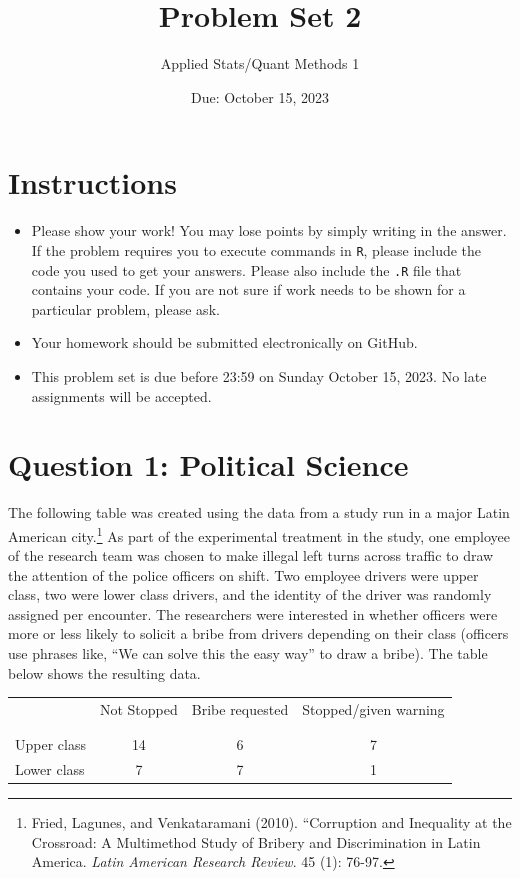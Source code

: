 \documentclass[12pt,letterpaper]{article}
\title{Problem Set 2}
\date{Due: October 15, 2023}
\author{Applied Stats/Quant Methods 1}
\begin{document}
	\maketitle
	\section*{Instructions}
	\begin{itemize}
		\item Please show your work! You may lose points by simply writing in the answer. If the problem requires you to execute commands in \texttt{R}, please include the code you used to get your answers. Please also include the \texttt{.R} file that contains your code. If you are not sure if work needs to be shown for a particular problem, please ask.
		\item Your homework should be submitted electronically on GitHub.
		\item This problem set is due before 23:59 on Sunday October 15, 2023. No late assignments will be accepted.
		
	\end{itemize}
	
	
	\vspace{.5cm}
	\section*{Question 1: Political Science}
	\vspace{.25cm}
	The following table was created using the data from a study run in a major Latin American city.\footnote{Fried, Lagunes, and Venkataramani (2010). ``Corruption and Inequality at the Crossroad: A Multimethod Study of Bribery and Discrimination in Latin America. \textit{Latin American Research Review}. 45 (1): 76-97.} As part of the experimental treatment in the study, one employee of the research team was chosen to make illegal left turns across traffic to draw the attention of the police officers on shift. Two employee drivers were upper class, two were lower class drivers, and the identity of the driver was randomly assigned per encounter. The researchers were interested in whether officers were more or less likely to solicit a bribe from drivers depending on their class (officers use phrases like, ``We can solve this the easy way'' to draw a bribe). The table below shows the resulting data.
	
	\newpage
	\begin{table}[h!]
		\centering
		\begin{tabular}{l | c c c }
			& Not Stopped & Bribe requested & Stopped/given warning \\
			\\[-1.8ex] 
			\hline \\[-1.8ex]
			Upper class & 14 & 6 & 7 \\
			Lower class & 7 & 7 & 1 \\
			\hline
		\end{tabular}
	\end{table}
	
\end{document}
